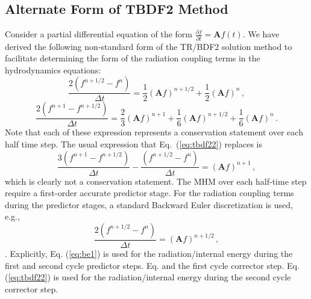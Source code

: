 \documentclass[preprint,12pt]{elsarticle}
\newcommand{\fn}[1]{\left( #1 \right)}
\newcommand{\dxdy}[2]{\frac{\partial #1}{\partial #2}}
\newcommand{\be}{\begin{equation}}
\newcommand{\ee}{\end{equation}}
\newcommand{\pec}{\, ,}
\newcommand{\pep}{\, .}
\newcommand{\lequ}[1]{\label{eq:#1}}
\newcommand{\equ}[1]{Eq.~(\ref{eq:#1})}
\newcommand{\requ}[1]{(\ref{eq:#1})}
\newcommand{\half}{\frac{1}{2}}
\newcommand{\mA}{\mathbf{A}}
\begin{document}
\subsection{Alternate Form of TBDF2 Method}
\label{sec:Alternate}
Consider a partial differential equation of the form $\dxdy{f}{t} = \mA f(t)$.  We have derived the following non-standard form of the TR/BDF2
solution method to facilitate determining the form 
of the radiation coupling terms in the hydrodynamics equations:
\be
\frac{2\fn{f^{n+1/2}-f^{n}}}{\Delta t} = \half (\mA f)^{n+1/2} + \half (\mA f)^{n} \pec
\lequ{tbdf21}
\ee
\be
\frac{2\fn{f^{n+1}-f^{n+1/2}}}{\Delta t} = 
\frac{2}{3} (\mA f)^{n+1} + \frac{1}{6} (\mA f)^{n+1/2} + \frac{1}{6} (\mA f)^{n} \pep
\lequ{tbdf22}
\ee
Note that each of these expression represents a conservation statement over each half time step.  
The usual expression that \equ{tbdf22} replaces is
\be
\frac{3\fn{f^{n+1}-f^{n+1/2}}}{\Delta t} - \frac{\fn{f^{n+1/2}-f^{n}}}{\Delta t}   = 
(\mA f)^{n+1} \pec
\lequ{tbdf23}
\ee
which is clearly not a conservation statement. The MHM over each half-time step require a first-order accurate predictor stage. For the radiation coupling terms during
the predictor stages, a standard Backward Euler discretization is used, e.g.,
\be
\frac{2\fn{f^{n+1/2}-f^{n}}}{\Delta t} = (\mA f)^{n+1/2} \pec
\lequ{be1}
\ee.
Explicitly, Eq. \requ{be1} is used for the radiation/internal energy during the first and second 
cycle predictor steps.  Eq. and the first cycle corrector step.  Eq. \requ{tbdf22} is used for the radiation/internal energy during the 
second cycle corrector step.
\end{document}

